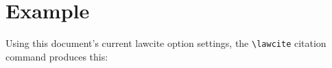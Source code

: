 \DeclareRobustCommand*{\autoref}{%
  \leavevmode
  \@ifstar{\HyRef@autoref\@gobbletwo}{\HyRef@autoref\hyper@@link}%
}
\def\HyRef@autoref#1#2{%
  \begingroup
    \Hy@safe@activestrue
    \expandafter\HyRef@autosetref\csname r@#2\endcsname{#2}{#1}%
  \endgroup
}
\def\HyRef@autosetref#1#2#3{%
  \HyRef@ShowKeysRef{#2}%
  \ifcase 0\ifx#1\relax 1\fi\ifx#1\Hy@varioref@undefined 1\fi\relax
    \edef\HyRef@thisref{%
      \expandafter\@fourthoffive#1\@empty\@empty\@empty
    }%
    \expandafter\HyRef@testreftype\HyRef@thisref.\\%
    \Hy@safe@activesfalse
    #3{%
      \expandafter\@fifthoffive#1\@empty\@empty\@empty
    }{%
      \expandafter\@fourthoffive#1\@empty\@empty\@empty
    }{%
      \HyRef@currentHtag
      \expandafter\@firstoffive#1\@empty\@empty\@empty
      \null
    }%
  \else
    \protect\G@refundefinedtrue
    \nfss@text{\reset@font\bfseries \fbox{\textcolor{red}{???}}}%
    \@latex@warning{%
      Reference `#2' on page \thepage\space undefined%
    }%
  \fi
}
\makeatother





\lcsetdemoon
\maketitle
\begin{abstract}
\myabstracttext
\end{abstract}
\newpage
\tableofcontents
\bigskip
\hfill{}\hfill\ %
\listoffigures
\listoftables
\bigskip
\hfill{}\hfill\ %
\bigskip
\newpage
\iftoggle{printlegtoc}{%
\let\oldtwocolumn\twocolumn
\renewcommand{\twocolumn}[1][]{#1}
\let\oldclearpage\clearpage
\renewcommand\clearpage{\relax}
\printindex[cases]
\printindex[legislation]
\iftoggle{printregulations}{\printindex[regulations]}{}
\renewcommand{\twocolumn}[1][]{\oldtwocolumn}
\renewcommand\clearpage{\oldclearpage}
}{}
\bigskip
\hfill{}\hfill\ %
\bigskip


\newpage
\section{Example}
Using this document's current lawcite option settings, the \texttt{\textbackslash lawcite} citation command produces this:

